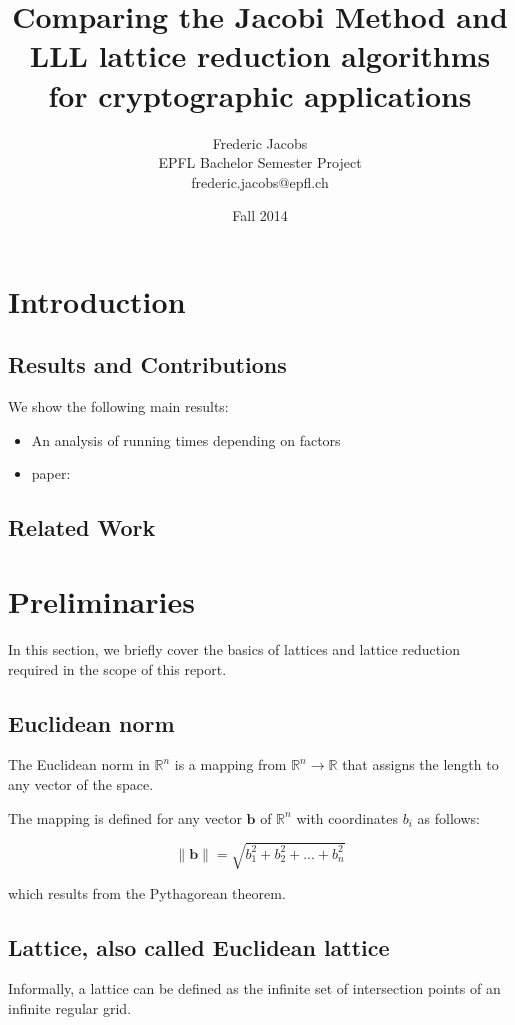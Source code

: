 \documentclass[10pt, a4paper]{article}
\title{Comparing the Jacobi Method and LLL lattice reduction algorithms for cryptographic applications}
\date{Fall 2014}
\author{Frederic Jacobs\\ EPFL Bachelor Semester Project\\ frederic.jacobs@epfl.ch}
\newcommand{\my}[1]{{\color{blue} #1 }}
\renewcommand{\vec}[1]{\mathbf{#1}}
\begin{document}
\maketitle

\section{Introduction}
\subsection{Results and Contributions}

\my{We show the following main results:
\begin{itemize}
\item An analysis of running times depending on factors
\item paper: \cite{originalJacobiMethodLatticeBasisReduction}
\end{itemize}
}
\subsection{Related Work}

\section{Preliminaries}

In this section, we briefly cover the basics of lattices and lattice reduction required in the scope of this report.

\subsection{Euclidean norm}

The Euclidean norm in $\mathbb{R}^n$ is a mapping from $\mathbb{R}^n \to \mathbb{R}$ that assigns the length to any vector of the space.

The mapping is defined for any vector $\vec{b}$ of $\mathbb{R}^n$ with coordinates $b_i$ as follows: 

\[
\|\mathbf{b}\| = \sqrt{b_1^2 + b_2^2 + ... + b_n^2} 
\] 

which results from the Pythagorean theorem.

\subsection{Lattice, also called Euclidean lattice}

Informally, a lattice can be defined as the infinite set of intersection points of an infinite regular grid.
\end{document}
